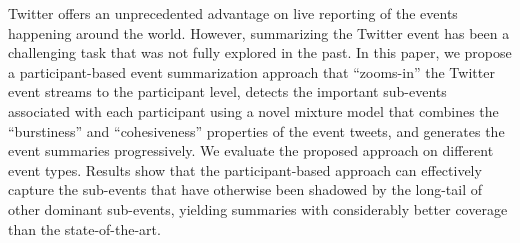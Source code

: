 Twitter offers an unprecedented advantage on live reporting of the events happening around the world. However, summarizing the Twitter event has been a
 challenging task that was not fully explored in the past. In this paper, we
 propose a participant-based event summarization approach that ``zooms-in'' the
 Twitter event streams to the participant level, detects the important
 sub-events associated with each participant using a novel mixture model that
 combines the ``burstiness'' and ``cohesiveness'' properties of the event tweets,
 and generates the event summaries progressively. We evaluate the proposed
 approach on different event types. Results show that the participant-based
 approach can effectively capture the sub-events that have otherwise been
 shadowed by the long-tail of other dominant sub-events, yielding summaries with
 considerably better coverage than the state-of-the-art.


